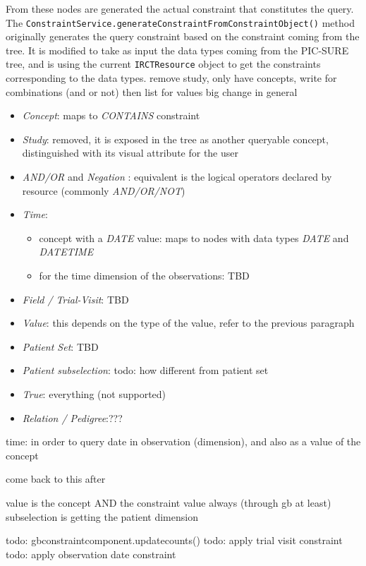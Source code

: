 From these nodes are generated the actual constraint that constitutes the query.
The \verb|ConstraintService.generateConstraintFromConstraintObject()| method originally generates the query constraint based on the constraint coming from the tree.
It is modified to take as input the data types coming from the PIC-SURE tree, and is using the current \verb|IRCTResource| object to get the constraints corresponding to the data types.
remove study, only have concepts, write for combinations (and or not) then list for values
big change in general
\begin{itemize}
    \item \emph{Concept}: maps to \emph{CONTAINS} constraint
    \item \emph{Study}: removed, it is exposed in the tree as another queryable concept, distinguished with its visual attribute for the user
    \item \emph{AND/OR} and \emph{Negation} : equivalent is the logical operators declared by resource (commonly \emph{AND/OR/NOT})
    \item \emph{Time}: 
    \begin{itemize}
        \item concept with a \emph{DATE} value: maps to nodes with data types \emph{DATE} and \emph{DATETIME}
        \item for the time dimension of the observations: TBD %
    \end{itemize}
    \item \emph{Field / Trial-Visit}: TBD
    \item \emph{Value}: this depends on the type of the value, refer to the previous paragraph
    \item \emph{Patient Set}: TBD %
    \item \emph{Patient subselection}: todo: how different from patient set
    \item \emph{True}: everything (not supported)
    \item \emph{Relation / Pedigree}:???
\end{itemize}

time: in order to query date in observation (dimension), and also as a value of the concept


come back to this after

value is the concept AND the constraint value always (through gb at least)
subselection is getting the patient dimension

todo: gbconstraintcomponent.updatecounts()
todo: apply trial visit constraint
todo: apply observation date constraint

